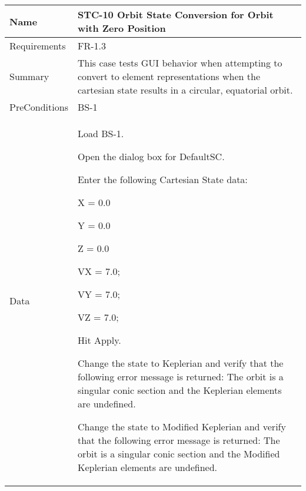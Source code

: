 







\begin{table}[htbp!]
\centering
      \begin{tabular}{|p{1.05 in} |p{4.75 in} |}
      \hline
         \rowcolor[rgb]{0.8,0.8,0.8} Name & STC-10 Orbit State Conversion for Orbit with Zero Position\\
         \hline
         Requirements & FR-1.3\\  \hline
         Summary &
         This  case tests GUI behavior when attempting to convert to element representations when the
         cartesian state results in a circular, equatorial orbit.
         \\     \hline
         PreConditions & BS-1\\     \hline
         Data &
         \begin{compactenum}
             \item Load BS-1.
             \item Open the dialog box for DefaultSC.
             \item Enter the following Cartesian State data:
                      \begin{compactenum}
                         \item X = 0.0
                         \item Y = 0.0
                         \item Z = 0.0
                         \item VX = 7.0;
                         \item VY = 7.0;
                         \item VZ = 7.0;
                      \end{compactenum}
             \item Hit Apply.
             \item Change the state to Keplerian and verify that the following error message is returned: The orbit is a singular conic section and the Keplerian elements are undefined.
             \item Change the state to Modified Keplerian and verify that the following error message is returned: The orbit is a singular conic section and the Modified Keplerian elements are undefined.

\end{compactenum}
\end{tabular}
\end{table}
